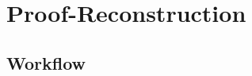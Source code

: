 \documentclass[../main.tex]{subfiles}
\begin{document}

\section{Proof-Reconstruction}
\label{sec:proof-reconstruction}

\subsection{Workflow}
\label{ssec:workflow}






\end{document}
